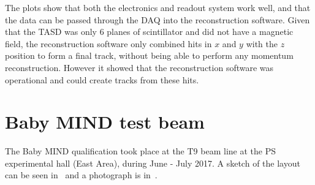 

The plots show that both the electronics and readout system work well, and that the data can be passed through the DAQ into the reconstruction software. Given that the TASD was only 6 planes of scintillator and did not have a magnetic field, the reconstruction software only combined hits in $x$ and $y$ with the $z$ position to form a final track, without being able to perform any momentum reconstruction. However it showed that the reconstruction software was operational and could create tracks from these hits.



\pagebreak
\section{Baby MIND test beam}

The Baby MIND qualification took place at the T9 beam line at the PS experimental hall (East Area), during June - July 2017. %
A sketch of the layout can be seen in~ and a photograph is in~.

